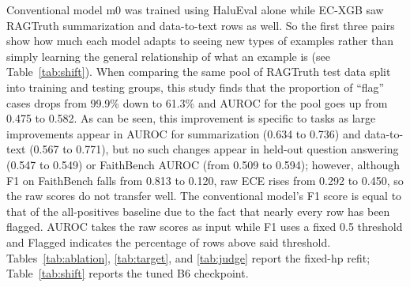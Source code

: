 \documentclass[a4paper,fleqn]{cas-sc}
\begin{document}
Conventional model m0 was trained using HaluEval alone while EC-XGB saw RAGTruth summarization and data-to-text rows as well. So the first three pairs show how much each model adapts to seeing new types of examples rather than simply learning the general relationship of what an example is (see Table~\ref{tab:shift}). When comparing the same pool of RAGTruth test data split into training and testing groups, this study finds that the proportion of ``flag'' cases drops from 99.9\% down to 61.3\% and AUROC for the pool goes up from 0.475 to 0.582. As can be seen, this improvement is specific to tasks as large improvements appear in AUROC for summarization (0.634 to 0.736) and data-to-text (0.567 to 0.771), but no such changes appear in held-out question answering (0.547 to 0.549) or FaithBench AUROC (from 0.509 to 0.594); however, although F1 on FaithBench falls from 0.813 to 0.120, raw ECE rises from 0.292 to 0.450, so the raw scores do not transfer well. The conventional model's F1 score is equal to that of the all-positives baseline due to the fact that nearly every row has been flagged. AUROC takes the raw scores as input while F1 uses a fixed 0.5 threshold and Flagged indicates the percentage of rows above said threshold. Tables~\ref{tab:ablation}, \ref{tab:target}, and \ref{tab:judge} report the fixed-hp refit; Table~\ref{tab:shift} reports the tuned B6 checkpoint.
\end{document}
